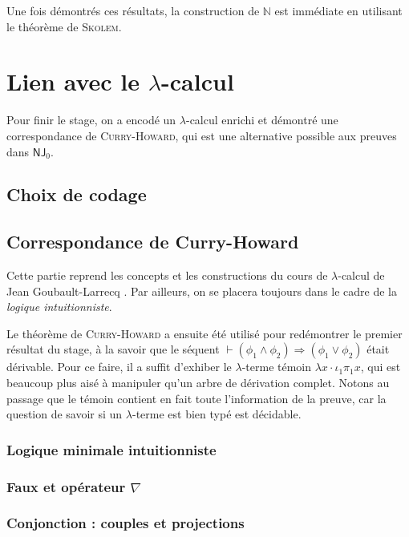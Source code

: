 \documentclass[a4paper]{article}
\newcommand{\N}{\ensuremath{\mathbb{N}}}
\newcommand{\NJ}{\mathsf{NJ}}
\theoremstyle{remark}
\theoremstyle{remark}
\theoremstyle{remark}
\theoremstyle{definition}
\theoremstyle{definition}
\theoremstyle{definition}
\begin{document}
Une fois démontrés ces résultats, la construction de $\N$ est immédiate en utilisant le théorème de \textsc{Skolem}.

\section{Lien avec le $\lambda$-calcul}

Pour finir le stage, on a encodé un $\lambda$-calcul enrichi et démontré une correspondance de \textsc{Curry-Howard}, qui est une alternative possible aux preuves dans $\NJ_0$.

\subsection{Choix de codage}


\subsection{Correspondance de {\sc Curry-Howard}}

Cette partie reprend les concepts et les constructions du cours de $\lambda$-calcul de Jean Goubault-Larrecq \cite{polylam}. Par ailleurs, on se placera toujours dans le cadre de la \emph{logique intuitionniste}.

Le théorème de \textsc{Curry-Howard} a ensuite été utilisé pour redémontrer le premier résultat du stage, à la savoir que le séquent $\vdash (\phi_1 \wedge \phi_2) \Rightarrow (\phi_1 \vee \phi_2)$ était dérivable. Pour ce faire, il a suffit d'exhiber le $\lambda$-terme témoin $\lambda x \cdot \iota_1 \pi_1 x$, qui est beaucoup plus aisé à manipuler qu'un arbre de dérivation complet. Notons au passage que le témoin contient en fait toute l'information de la preuve, car la question de savoir si un $\lambda$-terme est bien typé est décidable.

\subsubsection{Logique minimale intuitionniste}

\subsubsection{Faux et opérateur $\nabla$}


\subsubsection{Conjonction : couples et projections}
\end{document}
